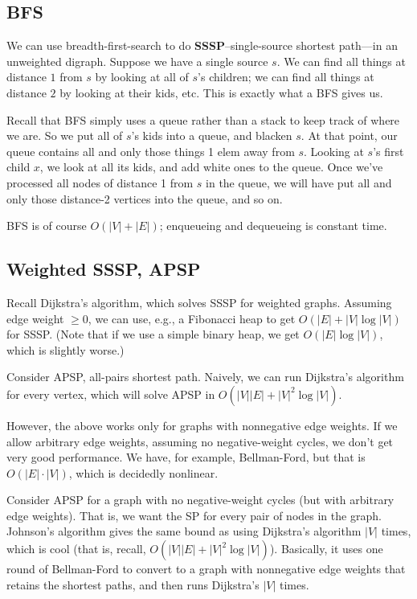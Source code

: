\documentclass{article}
\begin{document}
\subsection{BFS}

We can use breadth-first-search to do \textbf{SSSP}--single-source
shortest path---in an unweighted digraph.
Suppose we have a single source $s$.
We can find all things at distance $1$ from $s$ by looking at all of $s$'s
children; we can find all things at distance $2$ by looking at their
kids, etc.
This is exactly what a BFS gives us.

Recall that BFS simply uses a queue rather than a stack to keep track
of where we are.
So we put all of $s$'s kids into a queue, and blacken $s$.
At that point, our queue contains all and only those things 1 elem away
from $s$.
Looking at $s$'s first child $x$, we look at all its kids, and add
white ones to the queue.
Once we've processed all nodes of distance 1 from $s$ in the queue, we will
have put all and only those distance-2 vertices into the queue, and so on.

BFS is of course $O(|V| + |E|)$; enqueueing and dequeueing is
constant time.

\subsection{Weighted SSSP, APSP}

Recall Dijkstra's algorithm, which solves SSSP for weighted graphs.
Assuming edge weight $\geq 0$, we can use, e.g., a Fibonacci heap
to get $O(|E| + |V|\log|V|)$ for SSSP.
(Note that if we use a simple binary heap, we get $O(|E|\log|V|)$, which is
slightly worse.)

Consider APSP, all-pairs shortest path.
Naively, we can run Dijkstra's algorithm for every vertex, which will
solve APSP in $O(|V||E| + |V|^2\log|V|)$.

However, the above works only for graphs with nonnegative edge weights.
If we allow arbitrary edge weights, assuming no negative-weight
cycles, we don't get very good performance.
We have, for example, Bellman-Ford, but that is $O(|E|\cdot |V|)$, which is
decidedly nonlinear.

Consider APSP for a graph with no
negative-weight cycles (but with arbitrary edge weights).
That is, we want the SP for every pair of nodes in the graph.
Johnson's algorithm gives the same bound as using Dijkstra's algorithm
$|V|$ times, which is cool (that is, recall, $O(|V||E| + |V|^2\log|V|)$).
Basically, it uses one round of Bellman-Ford to convert to a graph with
nonnegative edge weights that retains the shortest paths, and then
runs Dijkstra's $|V|$ times.
\end{document}
